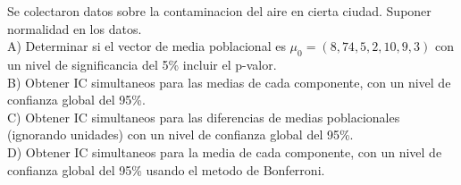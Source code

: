 \begin{problem}{1}
Se colectaron datos sobre la contaminacion del aire en cierta ciudad. Suponer normalidad
en los datos.\\
A) Determinar si el vector de media poblacional es $\mu_0=(8,74,5,2,10,9,3)$ con un nivel
de significancia del 5\% incluir el p-valor. \\  
B) Obtener IC simultaneos para las medias de cada componente, con un nivel de confianza  
global del 95\%. \\  
C) Obtener IC simultaneos para las diferencias de medias poblacionales (ignorando  
unidades) con un nivel de confianza global del 95\%. \\  
D) Obtener IC simultaneos para la media de cada componente, con un nivel de confianza  
global del 95\% usando el metodo de Bonferroni.  
\end{problem}
